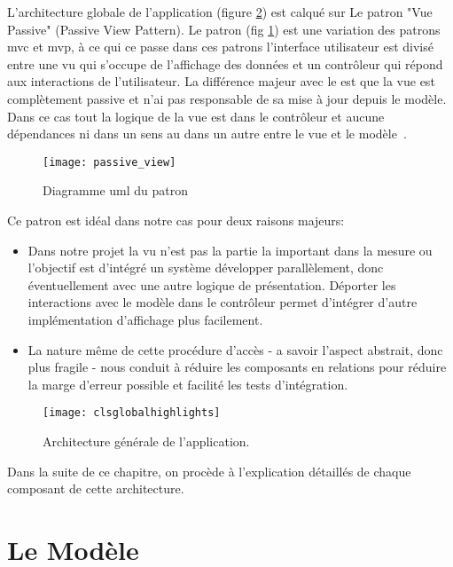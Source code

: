 L'architecture globale de l'application (figure \ref{fig:cls_global})
est calqué sur Le patron "Vue Passive" (Passive View Pattern). Le patron
 (fig \ref{fig:passive_view}) est une variation des
patrons \gls{mvc} et \gls{mvp}, à ce qui ce passe dans ces patrons
l'interface utilisateur est divisé entre une vu qui s'occupe de
l'affichage des données et un contrôleur qui répond aux interactions de
l'utilisateur. La différence majeur avec le  est que la
vue est complètement passive et n'ai pas responsable de sa mise à jour
depuis le modèle. Dans ce cas tout la logique de la vue est dans le
contrôleur et aucune dépendances ni dans un sens au dans un autre entre
le vue et le modèle~\cite{fowler:passive_view}.

\begin{figure}[H]
\center
\texttt{[image: passive\_view]}
\caption{Diagramme \gls{uml} du patron ~\cite{fowler:passive_view}}
\label{fig:passive_view}
\end{figure}

Ce patron est idéal dans notre cas pour deux raisons majeurs:

\begin{itemize} 

\item Dans notre projet la vu n'est pas la partie la important dans la
mesure ou l'objectif est d'intégré un système développer parallèlement,
donc éventuellement avec une autre logique de présentation. Déporter les
interactions avec le modèle dans le contrôleur permet d'intégrer d'autre
implémentation d'affichage plus facilement.

\item La nature même de cette procédure d’accès - a savoir l’aspect
abstrait, donc plus fragile - nous conduit à réduire les composants en
relations pour réduire la marge d'erreur possible et facilité les tests d’intégration.

\end{itemize}

\begin{figure}
\center
\texttt{[image: clsglobalhighlights]}
\caption{Architecture générale de l'application.}
\label{fig:cls_global}
\end{figure}

Dans la suite de ce chapitre, on procède à l'explication détaillés de chaque composant de cette architecture.

\section{Le Modèle} 

